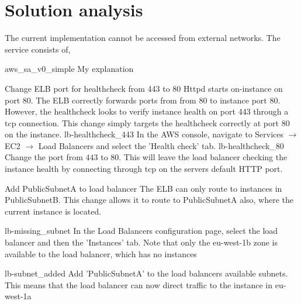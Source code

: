 \FloatBarrier

\section{Solution analysis}

The current implementation cannot be accessed from external networks. The service consists of,


\imagefigsingle
{aws_sa_v0_simple}
{My explanation}

\FloatBarrier

{Change ELB port for healthcheck from 443 to 80}
{
	Httpd starts on-instance on port 80. The ELB correctly forwards ports
	from from 80 to instance port 80.  However, the healthcheck looks to verify instance health on port 443 through a tcp connection. This change simply targets the healthcheck correctly at port 80 on the instance.
}
{
	\imagefigsinglebox
	{lb-healthcheck_443}
	{In the AWS console, navigate to Services  $\rightarrow$ EC2  $\rightarrow$ Load Balancers and select the 'Health check' tab.}
	\imagefigsinglebox
	{lb-healthcheck_80}
	{Change the port from $443$ to $80$. This will leave the load balancer checking the instance health by connecting through tcp on the servers default HTTP port.}
}

\FloatBarrier


{Add PublicSubnetA to load balancer}
{
	The ELB can only route to instances in PublicSubnetB. This change
	allows it to route to PublicSubnetA also, where the current instance is located.
}
{
	\imagefigsinglebox
	{lb-missing_subnet}
	{In the Load Balancers configuration page, select the load balancer and then the 'Instances' tab. Note that only the eu-west-1b zone is available to the load balancer, which has no instances}
	
	\imagefigsinglebox
		{lb-subnet_added}
	{Add 'PublicSubnetA' to the load balancers available subnets. This means that the load balancer can now direct traffic to the instance in eu-west-1a}
}

